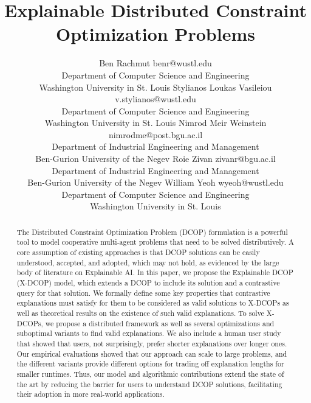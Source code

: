 \documentclass[twoside,11pt]{article}
\begin{document}
\title{Explainable Distributed Constraint Optimization Problems}


\author{\name Ben Rachmut \email benr@wustl.edu\\
\addr Department of Computer Science and Engineering\\
Washington University in St. Louis
\AND
\name Stylianos Loukas Vasileiou \email v.stylianos@wustl.edu \\
\addr Department of Computer Science and Engineering\\
Washington University in St. Louis
\AND
\name Nimrod Meir Weinstein \email nimrodme@post.bgu.ac.il \\
\addr  Department of Industrial Engineering and Management\\
Ben-Gurion University of the Negev 
\AND
\name Roie Zivan \email zivanr@bgu.ac.il \\
\addr  Department of Industrial Engineering and Management\\
Ben-Gurion University of the Negev 
\AND
\name William Yeoh \email wyeoh@wustl.edu \\
\addr Department of Computer Science and Engineering\\
Washington University in St. Louis
      }


\maketitle


\begin{abstract}
The Distributed Constraint Optimization Problem (DCOP) formulation is a powerful tool to model cooperative multi-agent problems that need to be solved distributively. A core assumption of existing approaches is that DCOP solutions can be easily understood, accepted, and adopted, which may not hold, as evidenced by the large body of literature on Explainable AI. In this paper, we propose the Explainable DCOP (X-DCOP) model, which extends a DCOP to include its solution and a contrastive query for that solution. We formally define some key properties that contrastive explanations must satisfy for them to be considered as valid solutions to X-DCOPs as well as theoretical results on the existence of such valid explanations. To solve X-DCOPs, we propose a distributed framework as well as several optimizations and suboptimal variants to find valid explanations. We also include a human user study that showed that users, not surprisingly, prefer shorter explanations over longer ones. Our empirical evaluations showed that our approach can scale to large problems, and the different variants provide different options for trading off explanation lengths for smaller runtimes. Thus, our model and algorithmic contributions extend the state of the art by reducing the barrier for users to understand DCOP solutions, facilitating their adoption in more real-world applications. 

\end{abstract}
\end{document}
